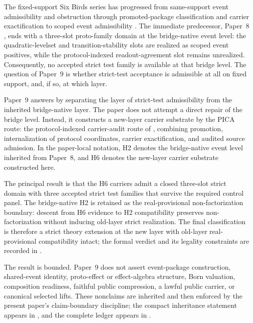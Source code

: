 \documentclass[11pt]{article}
\newcommand{\OldLayer}{H2}
\newcommand{\NewLayer}{H6}
\newcommand{\PaperNine}{Paper~9}
\newcommand{\PaperEight}{Paper~8}
\newcommand{\AcceptedTestCount}{three}
\newcommand{\OldLayerStatus}{real-provisional non-factorization boundary}
\theoremstyle{definition}
\begin{document}
The fixed-support Six Birds series has progressed from same-support event
admissibility and obstruction
\cite{Tsiokos2026LocallyBoolean,Tsiokos2026HolonomyMemory,Tsiokos2026MarkingErasureRecombination,Tsiokos2026RecombinationWitnesses}
through promoted-package classification and carrier exactification
\cite{Tsiokos2026PromotionCriteria,Tsiokos2026InternalStructure,Tsiokos2026CarrierExactification}
to scoped event admissibility \cite{Tsiokos2026CarrierToEvent}.  The immediate
predecessor, \PaperEight{} \cite{Tsiokos2026CarrierToEvent}, ends with a
three-slot proto-family domain at the bridge-native event level: the
quadratic-levelset and transition-stability slots are realized as scoped event
positives, while the protocol-indexed readout-agreement slot remains
unrealized.  Consequently, no accepted strict test family is available at that
bridge level.  The question of \PaperNine{} is whether strict-test acceptance
is admissible at all on fixed support, and, if so, at which layer.

\PaperNine{} answers by separating the layer of strict-test admissibility from
the inherited bridge-native layer.  The paper does not attempt a direct repair
of the bridge level.  Instead, it constructs a new-layer carrier substrate by
the PICA route: the protocol-indexed carrier-audit route of
, combining promotion, internalization of protocol
coordinates, carrier exactification, and audited source admission.  In the
paper-local notation, \OldLayer{} denotes the bridge-native event level
inherited from \PaperEight{}, and \NewLayer{} denotes the new-layer carrier
substrate constructed here.

The principal result is that the \NewLayer{} carriers admit a closed
three-slot strict domain with \AcceptedTestCount{} accepted strict test
families that survive the required control panel.  The bridge-native
\OldLayer{} is retained as the \OldLayerStatus{}: descent from \NewLayer{}
evidence to \OldLayer{} compatibility preserves non-factorization without
inducing old-layer strict realization.  The final classification is therefore a
strict theory extension at the new layer with old-layer real-provisional
compatibility intact; the formal verdict and its legality constraints are
recorded in .

The result is bounded.  \PaperNine{} does not assert event-package
construction, shared-event identity, proto-effect or effect-algebra structure,
Born valuation, composition readiness, faithful public compression, a lawful
public carrier, or canonical selected lifts.  These nonclaims are inherited and
then enforced by the present paper's claim-boundary discipline; the compact
inheritance statement appears in , and the
complete ledger appears in .
\end{document}
